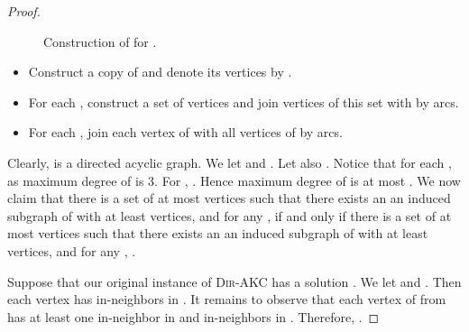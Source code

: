 \documentclass[11pt,a4paper]{article}
\newcommand{\DAKC}{\textsc{Dir-AKC}\xspace}
\begin{document}
\begin{proof}
\begin{figure}[ht]
\centering{}
\caption{Construction of  for .
\label{fig:W2h-2}}
\end{figure}

\begin{itemize}
\item Construct a copy of  and denote its vertices by .
\item For each , construct a set of  vertices  and join  vertices of this set with 
    by arcs.
\item For each , join each vertex of  with all vertices of  by arcs.
\end{itemize}
Clearly,  is a directed acyclic graph. We let  and . Let also . Notice that for
each ,  as maximum degree of  is 3. For , . Hence maximum degree of  is at most . We now claim that there is a set of at most  vertices
 such that there exists an an induced subgraph  of  with at least  vertices,  and
for any ,   if and only if there is a set of at most  vertices  such that there exists an an induced subgraph  of  with at least  vertices,  and for any
,  .

Suppose that our original instance of \DAKC has a solution . We let  and . Then each
vertex  has  in-neighbors in . It remains to observe that each vertex  of  from
 has at least one in-neighbor in  and  in-neighbors in . Therefore, .


\end{proof}
\end{document}
